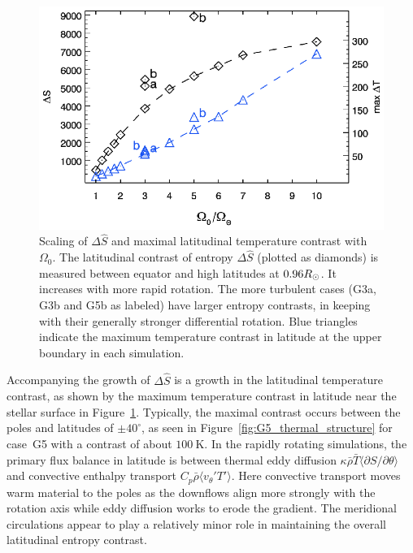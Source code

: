 \begin{figure}[!t]
  \begin{center}
    \includegraphics[width=0.7\linewidth]{figs/chapter_3/Figure_8.eps}
  \end{center}
  \caption[Scaling of $\Delta \widehat{S}$ and maximal latitudinal
  temperature contrast with $\Omega_0$]{
    Scaling of $\Delta \widehat{S}$ and maximal latitudinal temperature contrast with $\Omega_0$.
    The latitudinal contrast of entropy $\Delta \widehat{S}$  (plotted as diamonds) is measured between equator and
    high latitudes at $0.96R_\odot$.  It increases with more rapid rotation.
    The more turbulent cases (G3a, G3b and G5b as labeled)
    have larger entropy contrasts, in keeping with their generally
    stronger differential rotation.  Blue triangles indicate the
    maximum temperature contrast in latitude at the upper boundary in each simulation.  
  \label{fig:thermal_contrast_with_omega}}
\end{figure}


Accompanying the growth of $\Delta \widehat{S}$ is a growth in the latitudinal
temperature contrast, as shown by the maximum temperature contrast in
latitude near the stellar surface in
Figure~\ref{fig:thermal_contrast_with_omega}.  Typically, the maximal
contrast occurs between the poles and latitudes of $\pm40^\circ$, as
seen in Figure~\ref{fig:G5_thermal_structure} for case~G5 with a
contrast of about $100~\mathrm{K}$.  In the rapidly rotating
simulations, the primary flux balance in latitude is between thermal
eddy diffusion $\kappa \bar{\rho} \bar{T} \langle \partial S/\partial
\theta \rangle$ and convective enthalpy transport $C_p \bar{\rho}
\langle v_\theta' T' \rangle$.
Here convective transport moves warm
material to the poles as the downflows align more strongly with the
rotation axis while eddy diffusion works to erode the gradient.  
The meridional circulations appear to play a
relatively minor role in maintaining the overall latitudinal entropy
contrast.




